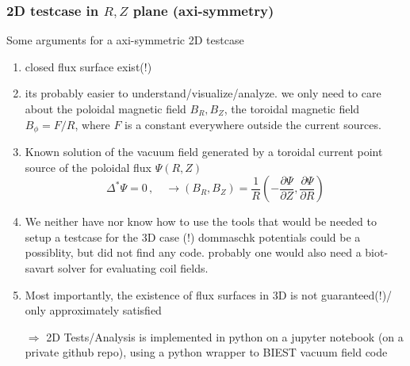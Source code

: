 \documentclass[aspectratio=169]{beamer}
\begin{document}
\begin{frame}
  \frametitle{2D testcase in $R,Z$ plane (axi-symmetry) }
  Some arguments for a axi-symmetric 2D testcase
  \small
  \begin{enumerate}
   \item closed flux surface exist(!)
   \item its probably easier to understand/visualize/analyze. we only need to care about the poloidal magnetic field $B_R,B_Z$, the toroidal magnetic field $B_\phi=F/R$, where $F$ is a constant everywhere outside the current sources. 
   \item Known solution of the vacuum field generated by a toroidal current point source of the poloidal flux $\Psi(R,Z)$
   \begin{equation*}
      \Delta^* \Psi =0\,,\quad \rightarrow (B_R,B_Z)=\frac{1}{R}(-\frac{\partial \Psi}{\partial Z},\frac{\partial \Psi}{\partial R})
   \end{equation*}
  \item  We neither have nor know how to use the tools that would be needed to setup a testcase for the 3D case (!)  dommaschk potentials  could be a possiblity, but did not find any code. probably one would also need a biot-savart solver for evaluating coil fields. 
   \item Most importantly, the existence of flux surfaces in 3D is not guaranteed(!)/ only approximately satisfied
   \item[$\Rightarrow$] 2D Tests/Analysis is implemented in python on a jupyter notebook (on a private github repo), using a python wrapper to BIEST vacuum field code
  \end{enumerate}
  
\end{frame}
\end{document}
